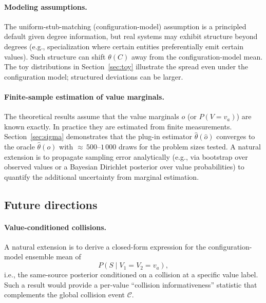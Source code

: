 \documentclass[11pt]{article}
\newcommand{\1}{\mathbf{1}}
\newcommand{\coll}{\mathcal{C}} %
\theoremstyle{plain}
\theoremstyle{definition}
\begin{document}
\paragraph{Modeling assumptions.}
The uniform-stub-matching (configuration-model) assumption is a principled default given degree information, but real systems may exhibit structure beyond degrees (e.g., specialization where certain entities preferentially emit certain values).
Such structure can shift $\theta(C)$ away from the configuration-model mean.
The toy distributions in Section~\ref{sec:toy} illustrate the spread even under the configuration model; structured deviations can be larger.

\paragraph{Finite-sample estimation of value marginals.}
The theoretical results assume that the value marginals $o$ (or $P(V{=}v_a)$) are known exactly.
In practice they are estimated from finite measurements.
Section~\ref{sec:sigma} demonstrates that the plug-in estimator $\widehat\theta(\hat o)$ converges to the oracle $\widehat\theta(o)$ with ${\approx}\,500$--$1\,000$ draws for the problem sizes tested.
A natural extension is to propagate sampling error analytically (e.g., via bootstrap over observed values or a Bayesian Dirichlet posterior over value probabilities) to quantify the additional uncertainty from marginal estimation.

\subsection{Future directions}

\paragraph{Value-conditioned collisions.}
A natural extension is to derive a closed-form expression for the configuration-model ensemble mean of
\[
P(S \mid V_1=V_2=v_a),
\]
i.e., the same-source posterior conditioned on a collision at a specific value label.
Such a result would provide a per-value ``collision informativeness'' statistic that complements the global collision event $\coll$.
\end{document}

